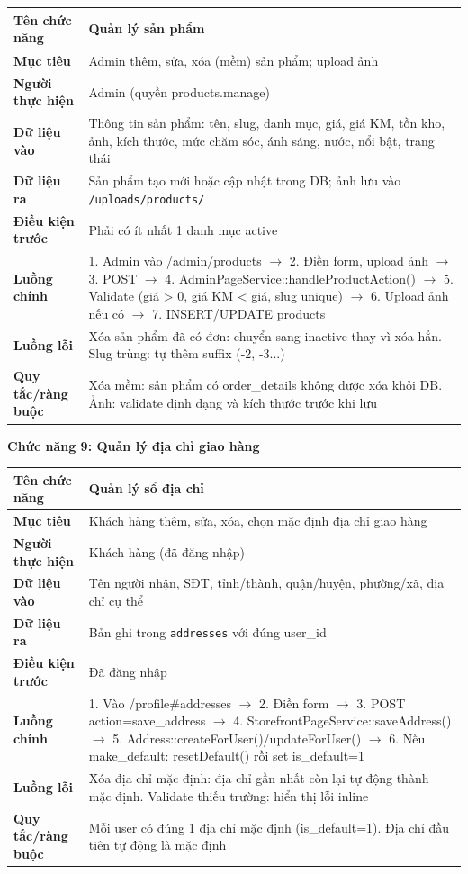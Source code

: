 \documentclass[a4paper]{article}
\begin{document}
\begin{longtable}{|p{3.5cm}|p{10.5cm}|}
\hline
\textbf{Tên chức năng} & Quản lý sản phẩm \\
\hline
\textbf{Mục tiêu} & Admin thêm, sửa, xóa (mềm) sản phẩm; upload ảnh \\
\hline
\textbf{Người thực hiện} & Admin (quyền products.manage) \\
\hline
\textbf{Dữ liệu vào} & Thông tin sản phẩm: tên, slug, danh mục, giá, giá KM, tồn kho, ảnh, kích thước, mức chăm sóc, ánh sáng, nước, nổi bật, trạng thái \\
\hline
\textbf{Dữ liệu ra} & Sản phẩm tạo mới hoặc cập nhật trong DB; ảnh lưu vào \texttt{/uploads/products/} \\
\hline
\textbf{Điều kiện trước} & Phải có ít nhất 1 danh mục active \\
\hline
\textbf{Luồng chính} & 1. Admin vào /admin/products $\to$ 2. Điền form, upload ảnh $\to$ 3. POST $\to$ 4. AdminPageService::handleProductAction() $\to$ 5. Validate (giá > 0, giá KM < giá, slug unique) $\to$ 6. Upload ảnh nếu có $\to$ 7. INSERT/UPDATE products \\
\hline
\textbf{Luồng lỗi} & Xóa sản phẩm đã có đơn: chuyển sang inactive thay vì xóa hẳn. Slug trùng: tự thêm suffix (-2, -3...) \\
\hline
\textbf{Quy tắc/ràng buộc} & Xóa mềm: sản phẩm có order\_details không được xóa khỏi DB. Ảnh: validate định dạng và kích thước trước khi lưu \\
\hline
\end{longtable}

\vspace{0.5cm}
\noindent\textbf{Chức năng 9: Quản lý địa chỉ giao hàng}

\begin{longtable}{|p{3.5cm}|p{10.5cm}|}
\hline
\textbf{Tên chức năng} & Quản lý sổ địa chỉ \\
\hline
\textbf{Mục tiêu} & Khách hàng thêm, sửa, xóa, chọn mặc định địa chỉ giao hàng \\
\hline
\textbf{Người thực hiện} & Khách hàng (đã đăng nhập) \\
\hline
\textbf{Dữ liệu vào} & Tên người nhận, SĐT, tỉnh/thành, quận/huyện, phường/xã, địa chỉ cụ thể \\
\hline
\textbf{Dữ liệu ra} & Bản ghi trong \texttt{addresses} với đúng user\_id \\
\hline
\textbf{Điều kiện trước} & Đã đăng nhập \\
\hline
\textbf{Luồng chính} & 1. Vào /profile\#addresses $\to$ 2. Điền form $\to$ 3. POST action=save\_address $\to$ 4. StorefrontPageService::saveAddress() $\to$ 5. Address::createForUser()/updateForUser() $\to$ 6. Nếu make\_default: resetDefault() rồi set is\_default=1 \\
\hline
\textbf{Luồng lỗi} & Xóa địa chỉ mặc định: địa chỉ gần nhất còn lại tự động thành mặc định. Validate thiếu trường: hiển thị lỗi inline \\
\hline
\textbf{Quy tắc/ràng buộc} & Mỗi user có đúng 1 địa chỉ mặc định (is\_default=1). Địa chỉ đầu tiên tự động là mặc định \\
\hline
\end{longtable}
\end{document}
